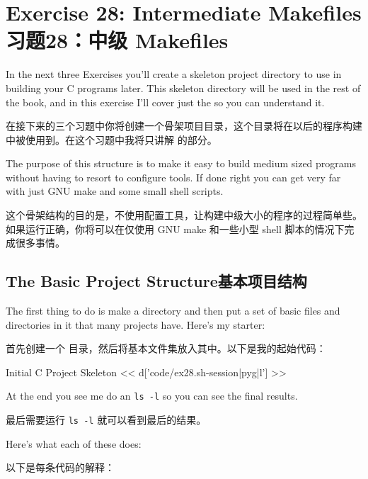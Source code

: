 \chapter{Exercise 28: Intermediate Makefiles 习题28：中级 Makefiles}

In the next three Exercises you'll create a skeleton project directory to use
in building your C programs later.  This skeleton directory will be used in the
rest of the book, and in this exercise I'll cover just the  so
you can understand it.

在接下来的三个习题中你将创建一个骨架项目目录，这个目录将在以后的程序构建中被使用到。在这个习题中我将只讲解  的部分。

The purpose of this structure is to make it easy to build medium sized programs
without having to resort to configure tools.  If done right you can get very far
with just GNU make and some small shell scripts.

这个骨架结构的目的是，不使用配置工具，让构建中级大小的程序的过程简单些。如果运行正确，你将可以在仅使用 GNU make 和一些小型 shell 脚本的情况下完成很多事情。

\section{The Basic Project Structure基本项目结构}

The first thing to do is make a  directory and then put
a set of basic files and directories in it that many projects have.  Here's
my starter:

首先创建一个  目录，然后将基本文件集放入其中。以下是我的起始代码：

\begin{code}{Initial C Project Skeleton}
<< d['code/ex28.sh-session|pyg|l'] >>
\end{code}

At the end you see me do an \verb|ls -l| so you can see the final results.

最后需要运行 \verb|ls -l| 就可以看到最后的结果。

Here's what each of these does:

以下是每条代码的解释：

